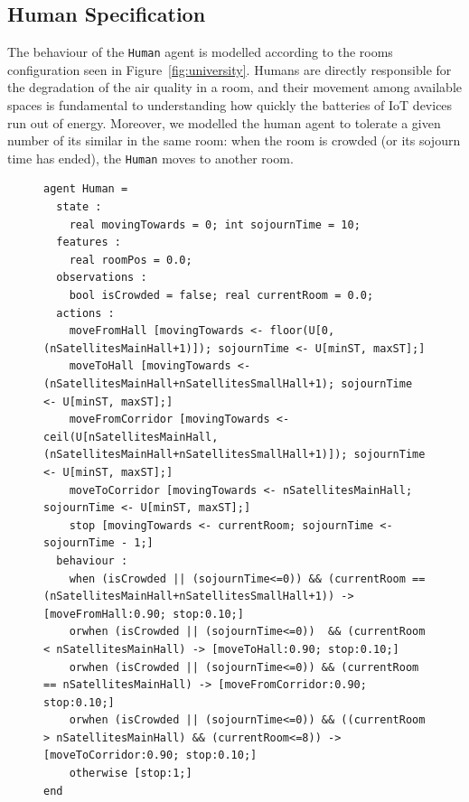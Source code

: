 \documentclass[runningheads]{llncs}
\begin{document}
\subsection{Human Specification}\label{subsec:humaspec}
The behaviour of the \lstinline{Human} agent is modelled according to the rooms configuration seen in Figure~\ref{fig:university}.
%
Humans are directly responsible for the degradation of the air quality in a room, and their movement among available spaces is fundamental to understanding how quickly the batteries of IoT devices run out of energy. 
%
Moreover, we modelled the human agent to tolerate a given number of its similar in the same room: when the room is crowded (or its sojourn time has ended), the \lstinline{Human} moves to another room.


\begin{figure}[!htbp]
\begin{lstlisting}[language=yoda,basicstyle=\scriptsize, caption={IAQ Scenario: \textsf{Human} agent}, label={lst:humanagent}]
agent Human =
  state :
    real movingTowards = 0; int sojournTime = 10;
  features :
    real roomPos = 0.0;
  observations :
    bool isCrowded = false; real currentRoom = 0.0;
  actions :
    moveFromHall [movingTowards <- floor(U[0,(nSatellitesMainHall+1)]); sojournTime <- U[minST, maxST];]
    moveToHall [movingTowards <- (nSatellitesMainHall+nSatellitesSmallHall+1); sojournTime <- U[minST, maxST];]
    moveFromCorridor [movingTowards <- ceil(U[nSatellitesMainHall,(nSatellitesMainHall+nSatellitesSmallHall+1)]); sojournTime <- U[minST, maxST];]
    moveToCorridor [movingTowards <- nSatellitesMainHall; sojournTime <- U[minST, maxST];]
    stop [movingTowards <- currentRoom; sojournTime <- sojournTime - 1;]
  behaviour :
    when (isCrowded || (sojournTime<=0)) && (currentRoom == (nSatellitesMainHall+nSatellitesSmallHall+1)) -> [moveFromHall:0.90; stop:0.10;]
    orwhen (isCrowded || (sojournTime<=0))  && (currentRoom < nSatellitesMainHall) -> [moveToHall:0.90; stop:0.10;]
    orwhen (isCrowded || (sojournTime<=0)) && (currentRoom == nSatellitesMainHall) -> [moveFromCorridor:0.90; stop:0.10;]
    orwhen (isCrowded || (sojournTime<=0)) && ((currentRoom > nSatellitesMainHall) && (currentRoom<=8)) -> [moveToCorridor:0.90; stop:0.10;]
    otherwise [stop:1;]
end
\end{lstlisting}
\end{figure}
\end{document}
